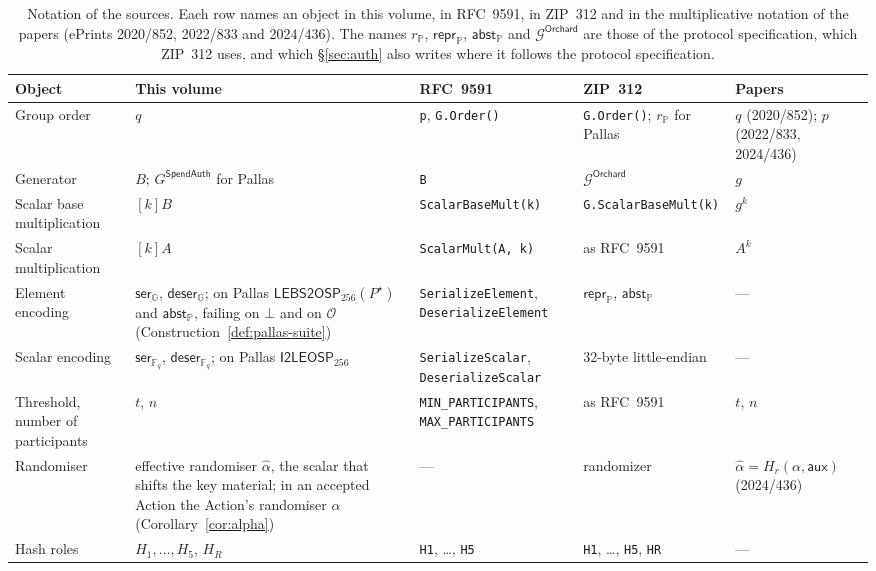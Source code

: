 \documentclass[11pt,a4paper]{article}
\theoremstyle{definition}
\newcommand{\F}{\mathbb{F}}
\newcommand{\G}{\mathbb{G}}
\newcommand{\PP}{\mathbb{P}}
\newcommand{\Fq}{\F_q}
\begin{document}
\begin{table}[t]
\centering
\footnotesize
\setlength{\tabcolsep}{4pt}
\begin{tabular}{@{}p{2.1cm}p{3.0cm}p{2.6cm}p{2.9cm}p{2.2cm}@{}}
\toprule
\raggedright Object & \raggedright This volume & \raggedright RFC~9591
  & \raggedright ZIP~312 & \raggedright Papers\tabularnewline
\midrule
\raggedright Group order & \raggedright \(q\) & \raggedright \texttt{p},
  \texttt{G.Order()} & \raggedright \texttt{G.Order()}; \(r_{\mathbb{P}}\)
  for Pallas & \raggedright \(q\) (2020/852); \(p\) (2022/833,
  2024/436)\tabularnewline
\raggedright Generator & \raggedright \(B\);
  \(G^{\mathsf{SpendAuth}}\) for Pallas & \raggedright \texttt{B}
  & \raggedright \(\mathcal{G}^{\mathsf{Orchard}}\)
  & \raggedright \(g\)\tabularnewline
\raggedright Scalar base multiplication & \raggedright \([k]B\)
  & \raggedright \texttt{ScalarBaseMult(k)}
  & \raggedright \texttt{G.ScalarBaseMult(k)}
  & \raggedright \(g^k\)\tabularnewline
\raggedright Scalar multiplication & \raggedright \([k]A\)
  & \raggedright \texttt{ScalarMult(A, k)} & \raggedright as RFC~9591
  & \raggedright \(A^k\)\tabularnewline
\raggedright Element encoding & \raggedright \(\mathsf{ser}_{\G}\),
  \(\mathsf{deser}_{\G}\); on Pallas \(\mathsf{LEBS2OSP}_{256}(P^{\star})\) and
  \(\mathsf{abst}_{\PP}\), failing on \(\bot\) and on \(\mathcal{O}\)
  (Construction~\ref{def:pallas-suite})
  & \raggedright \texttt{Serialize\-Element}, \texttt{Deserialize\-Element}
  & \raggedright \(\mathsf{repr}_{\mathbb{P}}\),
  \(\mathsf{abst}_{\mathbb{P}}\) & \raggedright ---\tabularnewline
\raggedright Scalar encoding
  & \raggedright \lineskiplimit=1.5pt \lineskip=1.5pt \(\mathsf{ser}_{\Fq}\),
  \(\mathsf{deser}_{\Fq}\); on Pallas \(\mathsf{I2LEOSP}_{256}\)
  & \raggedright \texttt{Serialize\-Scalar}, \texttt{Deserialize\-Scalar}
  & \raggedright 32-byte little-endian & \raggedright ---\tabularnewline
\raggedright Threshold, number of participants & \raggedright \(t\), \(n\)
  & \raggedright \texttt{MIN\_\allowbreak PARTICIPANTS},
  \texttt{MAX\_\allowbreak PARTICIPANTS} & \raggedright as RFC~9591
  & \raggedright \(t\), \(n\)\tabularnewline
\raggedright Randomiser & \raggedright effective randomiser
  \(\hat{\alpha}\), the scalar that shifts the key material; in an accepted
  Action the Action's randomiser \(\alpha\) (Corollary~\ref{cor:alpha})
  & \raggedright --- & \raggedright randomizer
  & \raggedright \(\hat{\alpha} = H_r(\alpha, \mathsf{aux})\)
  (2024/436)\tabularnewline
\raggedright Hash roles & \raggedright \(H_1, \dots, H_5\), \(H_R\)
  & \raggedright \texttt{H1}, \dots, \texttt{H5}
  & \raggedright \texttt{H1}, \dots, \texttt{H5}, \texttt{HR}
  & \raggedright ---\tabularnewline
\bottomrule
\end{tabular}
\caption{Notation of the sources. Each row names an object in this volume,
in RFC~9591, in ZIP~312 and in the multiplicative notation of the papers
(ePrints 2020/852, 2022/833 and 2024/436). The names \(r_{\mathbb{P}}\),
\(\mathsf{repr}_{\mathbb{P}}\), \(\mathsf{abst}_{\mathbb{P}}\) and
\(\mathcal{G}^{\mathsf{Orchard}}\) are those of the protocol specification,
which ZIP~312 uses, and which \S\ref{sec:auth} also writes where it
follows the protocol specification.}
\label{tab:notation}
\end{table}
\end{document}
